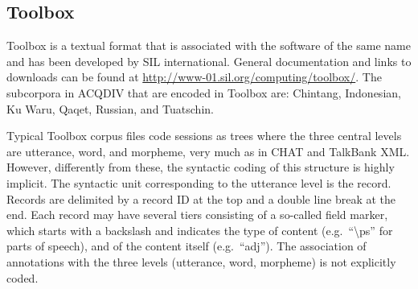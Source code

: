\documentclass[a4paper, 11pt]{book}
\begin{document}

\subsection{Toolbox}
\label{subsec:Toolbox}

Toolbox is a textual format that is associated with the software of the same name and has been developed by SIL international. General documentation and links to downloads can be found at \url{http://www-01.sil.org/computing/toolbox/}. The subcorpora in ACQDIV that are encoded in Toolbox are: Chintang, Indonesian, Ku Waru, Qaqet, Russian, and Tuatschin.

Typical Toolbox corpus files code sessions as trees where the three central levels are utterance, word, and morpheme, very much as in CHAT and TalkBank XML. However, differently from these, the syntactic coding of this structure is highly implicit. The syntactic unit corresponding to the utterance level is the record. Records are delimited by a record ID at the top and a double line break at the end. Each record may have several tiers consisting of a so-called field marker, which starts with a backslash and indicates the type of content (e.g.\ “\textbackslash ps” for parts of speech), and of the content itself (e.g.\ “adj”). The association of annotations with the three levels (utterance, word, morpheme) is not explicitly coded.
\end{document}
